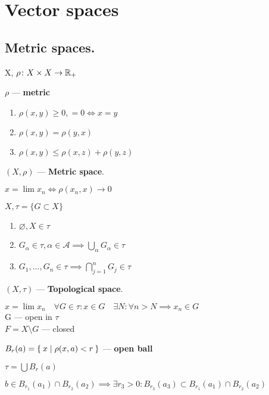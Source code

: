 \section{Vector spaces}
\subsection{Metric spaces.}

X, $\rho\colon X \times X \to \mathbb{R}_+$
\begin{defn}$\rho$ --- \textbf{metric}
  \begin{enumerate}
    \item $\rho(x, y) \geq 0, = 0 \iff x = y$
    \item $\rho(x, y) = \rho (y, x)$
    \item $\rho(x, y) \leq \rho (x, z) + \rho (y, z)$
  \end{enumerate}
\end{defn}
\begin{defn}$(X, \rho)$ --- \textbf{Metric space}.\end{defn}
\begin{defn}$x = \lim x_{n} \iff \rho(x_{n}, x) \rightarrow 0$\end{defn}
\vspace{5mm}
$X, \tau = \{G \subset X\}$
\begin{enumerate}
  \item $\varnothing, X \in \tau$
  \item $G_\alpha \in \tau, \alpha \in \mathscr{A} \implies \bigcup\limits_\alpha G_\alpha \in \tau$
  \item $G_1, \dotsc, G_n \in \tau \implies \bigcap\limits_{j = 1}^n G_j \in \tau$
\end{enumerate}
\begin{defn}$(X, \tau)$ --- \textbf{Topological space}.\end{defn}
$x = \lim x_n \quad \forall G \in \tau: x \in G \quad \exists N: \forall n > N \implies x_n \in G$\\
G --- open in $\tau$ \\
$F = X \setminus G$ --- closed
\begin{defn}
  $B_r (a) = \Set{x | \rho(x, a) < r}$ --- \textbf{open ball}
\end{defn}
\noindent
$\tau = \bigcup B_r (a)$
\begin{stm}
  $b \in B_{r_1} (a_1) \cap B_{r_2} (a_2) \implies \exists r_3 > 0: B_{r_3}
  (a_3) \subset B_{r_1} (a_1) \cap B_{r_2} (a_2)$
\end{stm}
\noindent

